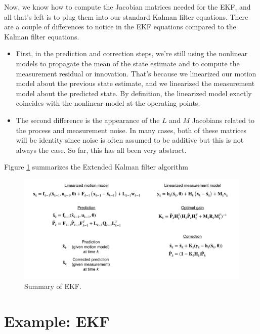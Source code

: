 Now, we know how to compute the Jacobian matrices needed for the EKF, and all that's left is to plug them into our standard Kalman
filter equations. There are a couple of differences to notice in the EKF equations compared to the Kalman filter equations.

\begin{itemize}
\item First, in the prediction and correction steps, we're still using the nonlinear models to propagate the mean of the state estimate and to compute
the measurement residual or innovation. That's because we linearized our motion model about the previous state estimate, and we linearized the measurement model
about the predicted state. By definition,
the linearized model exactly coincides with the nonlinear model
at the operating points. 
\item The second difference is the appearance of the $L$ and $M$ Jacobians related to the process and measurement noise. In many cases, both of these matrices
will be identity since noise is often assumed to be additive but this is not always the case. So far, this has all been very abstract. 
\end{itemize}

Figure \ref{kalman_6} summarizes the Extended Kalman filter algorithm

\begin{figure}[!htb]
\begin{center}
\includegraphics[scale=0.280]{img/kalman_filter/kalman_6.jpeg}
\end{center}
\caption{Summary of EKF.}
\label{kalman_6}
\end{figure}


\section{Example: EKF}
\label{example_ekf}

